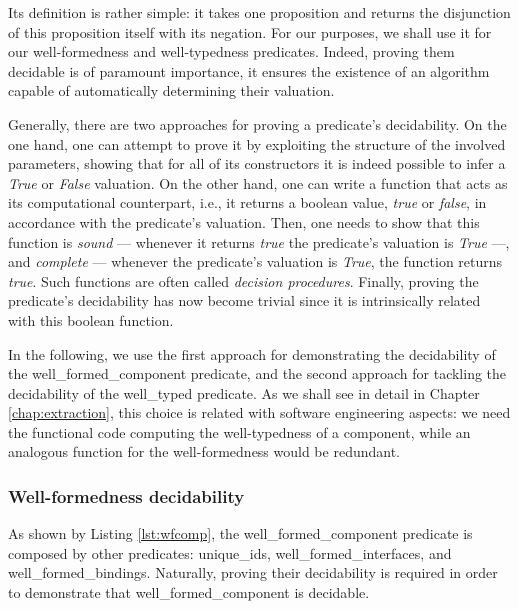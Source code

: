 	\noindent Its definition is rather simple: it takes one proposition and returns the disjunction of this 
	proposition itself with its negation. For our purposes, we shall use it for our
	well-formedness and well-typedness predicates. Indeed, proving them decidable is of 
	paramount importance, it ensures the existence of an algorithm capable of automatically 
	determining their valuation.

	Generally, there are two approaches for proving a predicate's decidability. On the one hand,
	one can attempt to prove it by exploiting the structure of the involved parameters, showing that for all
	of its constructors it is indeed possible to infer a \textit{True} or \textit{False} valuation. 
	On the other hand, one can	write a function that acts as its computational counterpart, i.e.,
	it returns a boolean value, \textit{true} or \textit{false}, in accordance with the predicate's 
	valuation. Then, one needs to show that this function is \textit{sound} --- whenever it returns 
	\textit{true} the predicate's valuation is \textit{True} ---, and \textit{complete} --- whenever
	 the predicate's valuation is \textit{True}, the function returns \textit{true}. Such 
	 functions are often called \textit{decision procedures}. Finally, proving the predicate's decidability
	 has now become trivial since it is intrinsically related with this boolean function.
	
		In the following, we use the first approach for demonstrating the decidability of the
	\textsf{well\_formed\_component} predicate, and the second approach for tackling the decidability 
	of the \textsf{well\_typed} predicate. As we shall see in detail in Chapter \ref{chap:extraction},
	this choice is related with software engineering aspects: we need the functional code
	computing the well-typedness of a \textsf{component}, while an analogous
	function for the well-formedness would be redundant.
	

\subsubsection{Well-formedness decidability}
	
				
		As shown by Listing \ref{lst:wfcomp}, the \textsf{well\_formed\_component} predicate is
	composed by other predicates: \textsf{unique\_ids}, \textsf{well\_formed\_interfaces}, and
	\textsf{well\_formed\_bindings}. Naturally, proving their decidability is required in order
	to demonstrate that  \textsf{well\_formed\_component} is decidable.	
	

